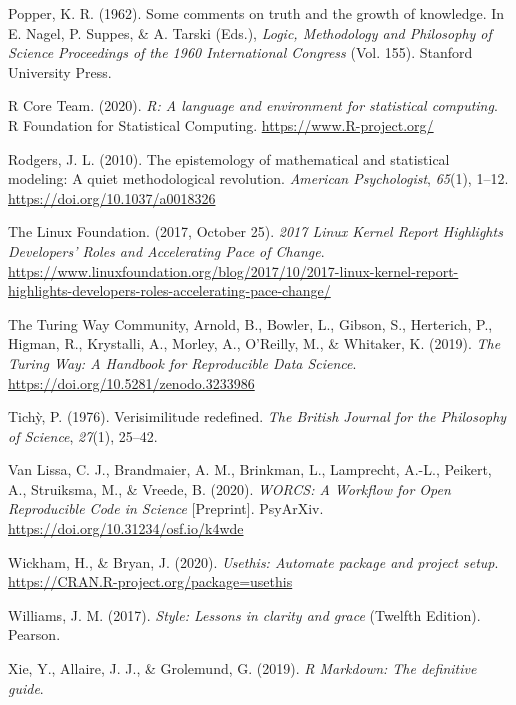 \documentclass[12pt,a4paper,twoside]{article}
\begin{document}
\leavevmode\hypertarget{ref-popperCommentsTruthGrowth1962}{}%
Popper, K. R. (1962). Some comments on truth and the growth of knowledge. In E. Nagel, P. Suppes, \& A. Tarski (Eds.), \emph{Logic, Methodology and Philosophy of Science Proceedings of the 1960 International Congress} (Vol. 155). Stanford University Press.

\leavevmode\hypertarget{ref-R-base}{}%
R Core Team. (2020). \emph{R: A language and environment for statistical computing}. R Foundation for Statistical Computing. \url{https://www.R-project.org/}

\leavevmode\hypertarget{ref-rodgersEpistemologyMathematicalStatistical2010}{}%
Rodgers, J. L. (2010). The epistemology of mathematical and statistical modeling: A quiet methodological revolution. \emph{American Psychologist}, \emph{65}(1), 1--12. \url{https://doi.org/10.1037/a0018326}

\leavevmode\hypertarget{ref-thelinuxfoundation2017LinuxKernel2017}{}%
The Linux Foundation. (2017, October 25). \emph{2017 Linux Kernel Report Highlights Developers' Roles and Accelerating Pace of Change}. \url{https://www.linuxfoundation.org/blog/2017/10/2017-linux-kernel-report-highlights-developers-roles-accelerating-pace-change/}

\leavevmode\hypertarget{ref-theturingwaycommunityTuringWayHandbook2019}{}%
The Turing Way Community, Arnold, B., Bowler, L., Gibson, S., Herterich, P., Higman, R., Krystalli, A., Morley, A., O'Reilly, M., \& Whitaker, K. (2019). \emph{The Turing Way: A Handbook for Reproducible Data Science}. \url{https://doi.org/10.5281/zenodo.3233986}

\leavevmode\hypertarget{ref-tichyVerisimilitudeRedefined1976}{}%
Tichỳ, P. (1976). Verisimilitude redefined. \emph{The British Journal for the Philosophy of Science}, \emph{27}(1), 25--42.

\leavevmode\hypertarget{ref-vanlissaWORCSWorkflowOpen2020}{}%
Van Lissa, C. J., Brandmaier, A. M., Brinkman, L., Lamprecht, A.-L., Peikert, A., Struiksma, M., \& Vreede, B. (2020). \emph{WORCS: A Workflow for Open Reproducible Code in Science} {[}Preprint{]}. PsyArXiv. \url{https://doi.org/10.31234/osf.io/k4wde}

\leavevmode\hypertarget{ref-R-usethis}{}%
Wickham, H., \& Bryan, J. (2020). \emph{Usethis: Automate package and project setup}. \url{https://CRAN.R-project.org/package=usethis}

\leavevmode\hypertarget{ref-williamsStyleLessonsClarity2017}{}%
Williams, J. M. (2017). \emph{Style: Lessons in clarity and grace} (Twelfth Edition). Pearson.

\leavevmode\hypertarget{ref-xieMarkdownDefinitiveGuide2019}{}%
Xie, Y., Allaire, J. J., \& Grolemund, G. (2019). \emph{R Markdown: The definitive guide}.
\end{document}
